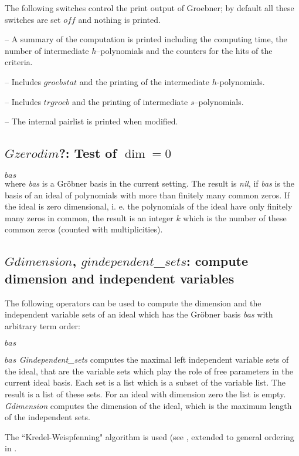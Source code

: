 The following switches control the print output of Groebner; by
default all these switches are set $off$ and nothing is printed.
\begin{description}
\item[$groebstat$] -- A summary of the computation is printed
including the computing time, the number of intermediate
$h$--polynomials and the counters for the hits of the criteria.

\item[$trgroeb$] -- Includes $groebstat$ and the printing of the
intermediate $h$-polynomials.

\item[$trgroebs$] -- Includes $trgroeb$ and the printing of
intermediate $s$--poly\-nomials.

\item[$trgroeb1$] -- The internal pairlist is printed when modified.
\end{description}

\subsection{$Gzerodim$?: Test of $\dim = 0$}
\begin{description}
\item[{\it gzerodim}!?] $bas$ \\
where {\it bas} is a Gr\"obner basis in the current setting.
The result is {\it nil}, if {\it bas} is the
basis of an ideal of polynomials with more than finitely many common zeros.
If the ideal is zero dimensional, i. e. the polynomials of the ideal have only
finitely many zeros in common, the result is an integer $k$ which is the number
of these common zeros (counted with multiplicities).
\end{description}

\subsection{$Gdimension$, $gindependent$\_$sets$: compute dimension and
independent variables}
The following operators can be used to compute the dimension
and the independent variable sets of an ideal which has the
Gr\"obner basis {\it bas} with arbitrary term order:
\begin{description}
\item[$gdimension$]$bas$
\item[$gindependent$\_$sets$]$bas$
{\it Gindependent\_sets} computes the maximal
left independent variable sets of the ideal, that are
the variable sets which play the role of free parameters in the
current ideal basis. Each set is a list which is a subset of the
variable list. The result is a list of these sets. For an
ideal with dimension zero the list is empty.
{\it Gdimension} computes the dimension of the ideal,
which is the maximum length of the independent sets.
\end{description}
The ``Kredel-Weispfenning" algorithm is used (see \cite{Kredel:88a},
extended to general ordering in \cite{BeWei:93}.

